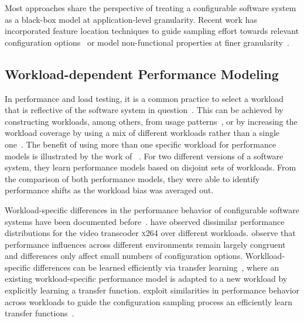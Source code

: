 Most approaches share the perspective of treating a configurable software system as a black-box model at application-level granularity. Recent work has incorporated feature location techniques to guide sampling effort towards relevant configuration options~\cite{velez_2020_configcrusher_jase,velez_comprex_2021} or model non-functional properties at finer granularity~\cite{weber_white_2021}.

\subsection{Workload-dependent Performance Modeling}

In performance and load testing, it is a common practice to select a workload that is reflective of the software system in question~\cite{ceesay2020,papadopoulos2021}. This can be achieved by constructing workloads, among others, from usage patterns~\cite{calzarossa2016}, or by increasing the workload coverage by using a mix of different workloads rather than a single one~\cite{jiang2015survey}.
The benefit of using more than one specific workload for performance models is illustrated by the work of \citeauthor{liao_2020_using_emse}~\cite{liao_2020_using_emse}. For two different versions of a software system, they learn performance models based on disjoint sets of workloads. From the comparison of both performance models, they were able to identify performance shifts as the workload bias was averaged out.

Workload-specific differences in the performance behavior of configurable software systems have been documented before~\cite{jamishidi_transfer_2017,alves_sampling_2020}. \citeauthor{alves_sampling_2020} have observed dissimilar performance distributions for the video transcoder \textsc{x264} over different  workloads. \citeauthor{jamishidi_transfer_2017} observe that performance influences across different environments remain largely congruent and differences only affect small numbers of configuration options. Worklload-specific differences can be learned efficiently via transfer learning~\cite{jamishidi_transfer_2017,jamshidi_transfer_gp_2017,ding_bayesian_2020}, where an existing workload-specific performance model is adapted to a new workload by explicitly learning a transfer function. \citeauthor{jamshidi_learning_2018} exploit similarities in performance behavior across workloads to guide the configuration sampling process an efficiently learn transfer functions~\cite{jamshidi_learning_2018}.

